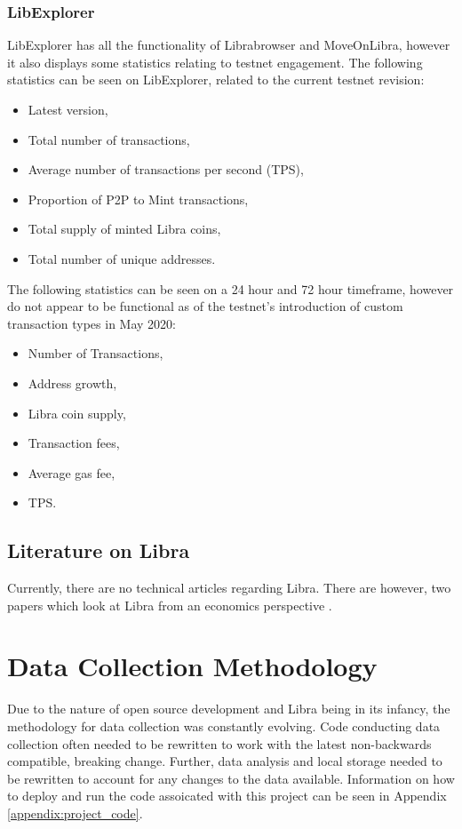 \documentclass[12pt,openany,a4paper]{book}
\begin{document}
\subsection{LibExplorer}
LibExplorer \cite{libexplorer} has all the functionality of Librabrowser and 
MoveOnLibra, however it also displays some statistics relating to testnet engagement.
The following statistics can be seen on LibExplorer, related to the current testnet revision:
\begin{itemize}
    \item Latest version,
    \item Total number of transactions,
    \item Average number of transactions per second (TPS),
    \item Proportion of P2P to Mint transactions, 
    \item Total supply of minted Libra coins,
    \item Total number of unique addresses.
\end{itemize}
The following statistics can be seen on a 24 hour and 72 hour timeframe, however do
not appear to be functional as of the testnet's introduction of custom transaction types in May 2020:
\begin{itemize}
    \item Number of Transactions,
    \item Address growth,
    \item Libra coin supply,
    \item Transaction fees,
    \item Average gas fee,
    \item TPS.
\end{itemize}

\section{Literature on Libra}
Currently, there are no technical articles regarding Libra.
There are however, two papers which look at Libra from an economics 
perspective \cite{taskinsoy, rirsh_tomanek}.


\chapter{Data Collection Methodology}
\label{__data_collection}
Due to the nature of open source development and Libra being in its infancy, the 
methodology for data collection was constantly evolving.
Code conducting data collection often needed to be rewritten to work with the latest 
non-backwards compatible, breaking change. Further, data analysis and local storage 
needed to be rewritten to account for any changes to the data available. Information 
on how to deploy and run the code assoicated with this project can be seen in 
Appendix \ref{appendix:project_code}.
\end{document}
